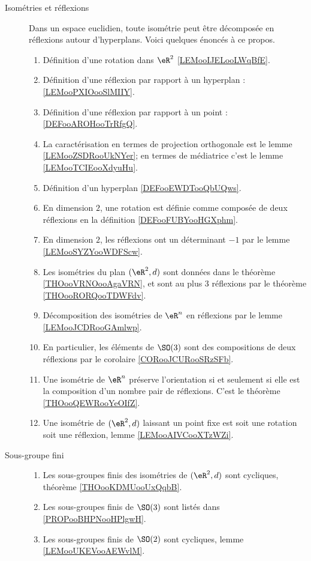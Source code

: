\begin{description}
	\item[Isométries et réflexions]
	      Dans un espace euclidien, toute isométrie peut être décomposée en réflexions autour d'hyperplans. Voici quelques énoncés à ce propos.
	      \begin{enumerate}
		      \item
		            Définition d'une rotation dans \( \eR^2\) \ref{LEMooIJELooLWqBfE}.
		      \item
		            Définition d'une réflexion par rapport à un hyperplan : \ref{LEMooPXIOooSlMIIY}.
		      \item
		            Définition d'une réflexion par rapport à un point : \ref{DEFooAROHooTrRfgQ}.
		      \item
		            La caractérisation en termes de projection orthogonale est le lemme \ref{LEMooZSDRooUkNYer}; en termes de médiatrice c'est le lemme \ref{LEMooTCIEooXdyuHu}.
		      \item
		            Définition d'un hyperplan \ref{DEFooEWDTooQbUQws}.
		      \item
		            En dimension \( 2\), une rotation est définie comme composée de deux réflexions en la définition \ref{DEFooFUBYooHGXphm}.
		      \item
		            En dimension \( 2\), les réflexions ont un déterminant \( -1\) par le lemme \ref{LEMooSYZYooWDFScw}.
		      \item
		            Les isométries du plan \( (\eR^2,d)\) sont données dans le théorème \ref{THOooVRNOooAgaVRN}, et sont au plus 3 réflexions par le théorème \ref{THOooRORQooTDWFdv}.
		      \item
		            Décomposition des isométries de \( \eR^n\) en réflexions par le lemme \ref{LEMooJCDRooGAmlwp}.
		      \item
		            En particulier, les éléments de \( \SO(3)\) sont des compositions de deux réflexions par le corolaire \ref{CORooJCURooSRzSFb}.
		      \item
		            Une isométrie de \( \eR^n\) préserve l'orientation si et seulement si elle est la composition d'un nombre pair de réflexions. C'est le théorème \ref{THOooQEWRooYeOIfZ}.
		      \item
		            Une isométrie de \( (\eR^2,d)\) laissant un point fixe est soit une rotation soit une réflexion, lemme \ref{LEMooAIVCooXTzWZi}.
	      \end{enumerate}
	\item[Sous-groupe fini]
	      \begin{enumerate}
		      \item
		            Les sous-groupes finis des isométries de \( (\eR^2,d)\) sont cycliques, théorème \ref{THOooKDMUooUxQqbB}.
		      \item
		            Les sous-groupes finis de \( \SO(3)\) sont listés dans \ref{PROPooBHPNooHPlgwH}.
		      \item
		            Les sous-groupes finis de \( \SO(2)\) sont cycliques, lemme \ref{LEMooUKEVooAEWvlM}.
	      \end{enumerate}
\end{description}
